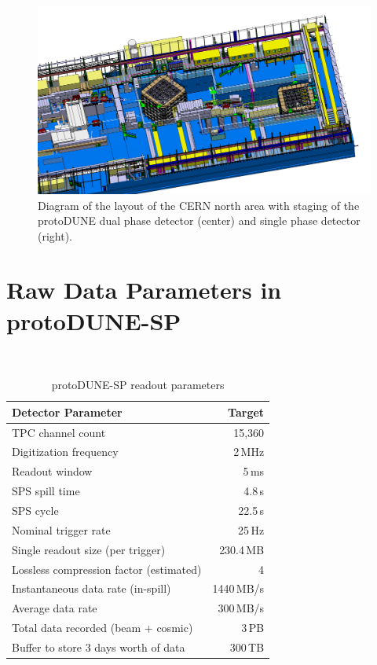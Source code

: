 \documentclass[pdftex,12pt,letter]{article}
\begin{document}
\begin{figure}[tb]
\centering\includegraphics[width=1.0\textwidth]{np02np04.png}
\caption{\label{fig:np02np04}Diagram of the layout of the CERN north area with
  staging of the protoDUNE dual phase detector (center) and single
  phase detector (right).}
\end{figure}

\section{Raw Data Parameters in protoDUNE-SP}
\label{sec:np04_data_rate}


\begin{table}
\begin{center}
\caption{\label{table:np04_data_rate}
  protoDUNE-SP readout parameters}
\ \\
\begin{tabularx}{0.75\textwidth}{ X  >{\setlength{\hsize}{0.8\hsize}}r}
\hline
Detector Parameter & Target \\
\hline
TPC channel count & 15,360 \\
Digitization frequency & 2\,MHz \\
Readout window & 5\,ms \\
SPS spill time& 4.8\,s\\
SPS cycle& 22.5\,s\\
Nominal trigger rate & 25\,Hz \\
Single readout size (per trigger) & 230.4\,MB \\
Lossless compression factor (estimated) & 4 \\
Instantaneous data rate (in-spill) & 1440\,MB/s \\
Average data rate & 300\,MB/s \\
Total data recorded (beam + cosmic) & 3\,PB\\
Buffer to store 3 days worth of data & 300\,TB\\
\hline
\end{tabularx}
\end{center}
\end{table}
\end{document}
